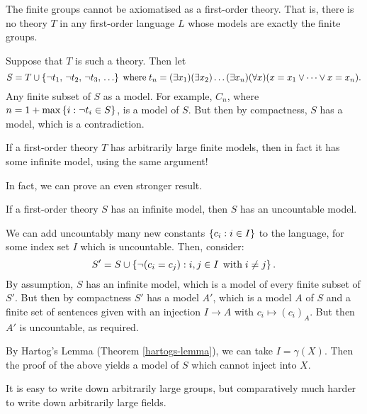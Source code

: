 \documentclass{article}
\begin{document}
\begin{proposition}
   The finite groups cannot be axiomatised as a first-order theory. That is, there is no theory $T$ in any first-order language $L$ whose models are exactly the finite groups.
\end{proposition}

\begin{prf}
    Suppose that $T$ is such a theory. Then let
    \[
	S = T \cup \set{\lnot t_1, \, \lnot t_2, \, \lnot t_3, \, \dots}
	\where t_n = (\exists x_1)(\exists x_2)\dots(\exists x_n)(\forall x)(x = x_1 \lor \dots \lor x = x_n).
	\]
	Any finite subset of $S$ as a model. For example, $C_n$, where $n = 1 + \max \left\lbrace i : \lnot t_i \in S \right\rbrace$, is a model of $S$. But then by compactness, $S$ has a model, which is a contradiction.
\end{prf}

\begin{corollary}
    If a first-order theory $T$ has arbitrarily large finite models, then in fact it has some infinite model, using the same argument!
\end{corollary}

In fact, we can prove an even stronger result.

\begin{theorem}
    If a first-order theory $S$ has an infinite model, then $S$ has an uncountable model.
\end{theorem}

\begin{prf}
    We can add uncountably many new constants $\left\lbrace c_i : i \in I \right\rbrace$ to the language, for some index set $I$ which is uncountable. Then, consider:
    \[
	S' = S \cup \left\lbrace \lnot (c_i = c_j) : i, j \in I \mathrel{\, \text{with}} i \neq j \right\rbrace.
	\]
	By assumption, $S$ has an infinite model, which is a model of every finite subset of $S'$. But then by compactness $S'$ has a model $A'$, which is a model $A$ of $S$ and a finite set of sentences given with an injection $I \to A$ with $c_i \mapsto (c_i)_A$. But then $A'$ is uncountable, as required.
\end{prf}

\begin{corollary}
	By Hartog's Lemma (Theorem \ref{hartogs-lemma}), we can take $I = \gamma(X)$. Then the proof of the above yields a model of $S$ which cannot inject into $X$.
\end{corollary}

\begin{note}
	It is easy to write down arbitrarily large groups, but comparatively much harder to write down arbitrarily large fields.
\end{note}
\end{document}
